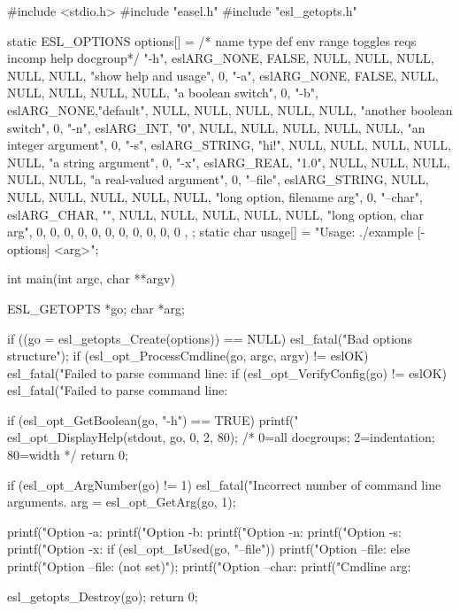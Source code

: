 \begin{cchunk}
#include <stdio.h>
#include "easel.h"
#include "esl_getopts.h"

static ESL_OPTIONS options[] = {
  /* name        type          def   env  range toggles reqs incomp help                       docgroup*/
  { "-h",     eslARG_NONE,    FALSE, NULL, NULL, NULL, NULL, NULL, "show help and usage",       0},
  { "-a",     eslARG_NONE,    FALSE, NULL, NULL, NULL, NULL, NULL, "a boolean switch",          0},
  { "-b",     eslARG_NONE,"default", NULL, NULL, NULL, NULL, NULL, "another boolean switch",    0},
  { "-n",     eslARG_INT,       "0", NULL, NULL, NULL, NULL, NULL, "an integer argument",       0},
  { "-s",     eslARG_STRING,  "hi!", NULL, NULL, NULL, NULL, NULL, "a string argument",         0},
  { "-x",     eslARG_REAL,    "1.0", NULL, NULL, NULL, NULL, NULL, "a real-valued argument",    0},
  { "--file", eslARG_STRING,   NULL, NULL, NULL, NULL, NULL, NULL, "long option, filename arg", 0},
  { "--char", eslARG_CHAR,       "", NULL, NULL, NULL, NULL, NULL, "long option, char arg",     0},
  { 0, 0, 0, 0, 0, 0, 0, 0, 0, 0 }, 
};
static char usage[] = "Usage: ./example [-options] <arg>";

int
main(int argc, char **argv)
{
  ESL_GETOPTS *go;
  char        *arg;

  if ((go = esl_getopts_Create(options))     == NULL)  esl_fatal("Bad options structure\n");  
  if (esl_opt_ProcessCmdline(go, argc, argv) != eslOK) esl_fatal("Failed to parse command line: %
  if (esl_opt_VerifyConfig(go)               != eslOK) esl_fatal("Failed to parse command line: %

  if (esl_opt_GetBoolean(go, "-h") == TRUE) {
    printf("%
    esl_opt_DisplayHelp(stdout, go, 0, 2, 80); /* 0=all docgroups; 2=indentation; 80=width */
    return 0;
  }

  if (esl_opt_ArgNumber(go) != 1) esl_fatal("Incorrect number of command line arguments.\n%
  arg = esl_opt_GetArg(go, 1);

  printf("Option -a:      %
  printf("Option -b:      %
  printf("Option -n:      %
  printf("Option -s:      %
  printf("Option -x:      %
  if (esl_opt_IsUsed(go, "--file")) printf("Option --file:  %
  else                              printf("Option --file:  (not set)\n");
  printf("Option --char:  %
  printf("Cmdline arg:    %

  esl_getopts_Destroy(go);
  return 0;
}
\end{cchunk}
